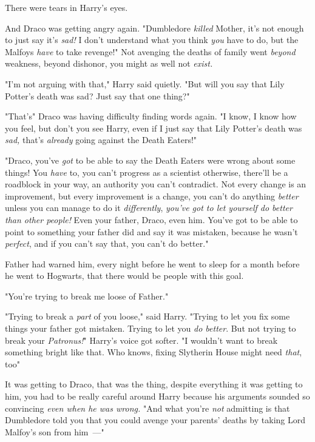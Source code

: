 There were tears in Harry's eyes.

And Draco was getting angry again. "Dumbledore \emph{killed} Mother, it's not
enough to just say it's \emph{sad!} I don't understand what you think
\emph{you} have to do, but the Malfoys \emph{have} to take revenge!" Not
avenging the deaths of family went \emph{beyond} weakness, beyond dishonor, you
might as well not \emph{exist.}

"I'm not arguing with that," Harry said quietly. "But will you say that Lily
Potter's death was sad? Just say that one thing?"

"That's{\el}" Draco was having difficulty finding words again. "I know, I
know how you feel, but don't you see Harry, even if I just say that Lily
Potter's death was \emph{sad,} that's \emph{already} going against the Death
Eaters!"

"Draco, you've \emph{got} to be able to say the Death Eaters were wrong about
some things! You \emph{have} to, you can't progress as a scientist otherwise,
there'll be a roadblock in your way, an authority you can't contradict. Not
every change is an improvement, but every improvement is a change, you can't do
anything \emph{better} unless you can manage to do it \emph{differently},
\emph{you've got to let yourself do better than other people!} Even your
father, Draco, even him. You've got to be able to point to something your
father did and say it was mistaken, because he wasn't \emph{perfect}, and if
you can't say that, you can't do better."

Father had warned him, every night before he went to sleep for a month before
he went to Hogwarts, that there would be people with this goal.

"You're trying to break me loose of Father."

"Trying to break a \emph{part} of you loose," said Harry. "Trying to let you
fix some things your father got mistaken. Trying to let you \emph{do better}.
But not{\el} trying to break your \emph{Patronus!}" Harry's voice got
softer. "I wouldn't want to break something bright like that. Who knows, fixing
Slytherin House might need \emph{that}, too{\el}"

It was getting to Draco, that was the thing, despite everything it was getting
to him, you had to be really careful around Harry because his arguments sounded
so convincing \emph{even when he was wrong.} "And what you're \emph{not}
admitting is that Dumbledore told you that you could avenge your parents'
deaths by taking Lord Malfoy's son from him~---"


